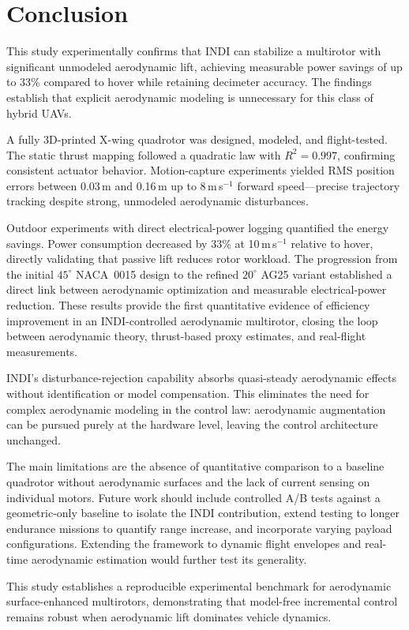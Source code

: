 
\chapter{Conclusion}\label{chapter:conclusion}

This study experimentally confirms that INDI can stabilize a multirotor with significant unmodeled aerodynamic lift, achieving measurable power savings of up to 33\% compared to hover while retaining decimeter accuracy.
The findings establish that explicit aerodynamic modeling is unnecessary for this class of hybrid UAVs.

A fully 3D-printed X-wing quadrotor was designed, modeled, and flight-tested.
The static thrust mapping followed a quadratic law with $R^2=0.997$, confirming consistent actuator behavior.
Motion-capture experiments yielded RMS position errors between 0.03\,m and 0.16\,m up to 8\,m\,s$^{-1}$ forward speed—precise trajectory tracking despite strong, unmodeled aerodynamic disturbances.

Outdoor experiments with direct electrical-power logging quantified the energy savings.
Power consumption decreased by 33\% at 10\,m\,s$^{-1}$ relative to hover, directly validating that passive lift reduces rotor workload.
The progression from the initial $45^{\circ}$ NACA~0015 design to the refined $20^{\circ}$ AG25 variant established a direct link between aerodynamic optimization and measurable electrical-power reduction.
These results provide the first quantitative evidence of efficiency improvement in an INDI-controlled aerodynamic multirotor, closing the loop between aerodynamic theory, thrust-based proxy estimates, and real-flight measurements.

INDI's disturbance-rejection capability absorbs quasi-steady aerodynamic effects without identification or model compensation.
This eliminates the need for complex aerodynamic modeling in the control law: aerodynamic augmentation can be pursued purely at the hardware level, leaving the control architecture unchanged.

The main limitations are the absence of quantitative comparison to a baseline quadrotor without aerodynamic surfaces and the lack of current sensing on individual motors.
Future work should include controlled A/B tests against a geometric-only baseline to isolate the INDI contribution, extend testing to longer endurance missions to quantify range increase, and incorporate varying payload configurations.
Extending the framework to dynamic flight envelopes and real-time aerodynamic estimation would further test its generality.

This study establishes a reproducible experimental benchmark for aerodynamic surface-enhanced multirotors, demonstrating that model-free incremental control remains robust when aerodynamic lift dominates vehicle dynamics.

